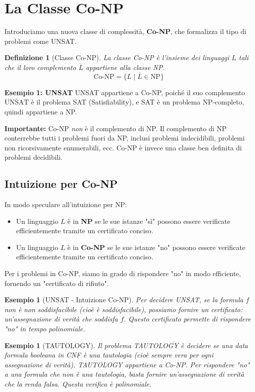 \documentclass[a4paper, 11pt]{book} %
\newtheorem{definition}[theorem]{Definizione}
\newtheorem{example}[theorem]{Esempio}
\theoremstyle{definition}
\begin{document}
\section{La Classe Co-NP}

Introduciamo una nuova classe di complessità, \textbf{Co-NP}, che formalizza il tipo di problemi come UNSAT.

\begin{definition}[Classe Co-NP]
La classe Co-NP è l'insieme dei linguaggi $L$ tali che il loro complemento $\overline{L}$ appartiene alla classe NP.
\[
\text{Co-NP} = \{ L \mid \overline{L} \in \text{NP} \}
\]
\end{definition}

\textbf{Esempio 1: UNSAT}
UNSAT appartiene a Co-NP, poiché il suo complemento $\overline{\text{UNSAT}}$ è il problema SAT (Satisfiability), e SAT è un problema NP-completo, quindi appartiene a NP.

\textbf{Importante:} Co-NP \textit{non} è il complemento di NP. Il complemento di NP conterrebbe tutti i problemi fuori da NP, inclusi problemi indecidibili, problemi non ricorsivamente enumerabili, ecc. Co-NP è invece una classe ben definita di problemi decidibili.

\subsection{Intuizione per Co-NP}
In modo speculare all'intuizione per NP:
\begin{itemize}
    \item Un linguaggio $L$ è in \textbf{NP} se le sue istanze "sì" possono essere verificate efficientemente tramite un certificato conciso.
    \item Un linguaggio $L$ è in \textbf{Co-NP} se le sue istanze "no" possono essere verificate efficientemente tramite un certificato conciso.
\end{itemize}
Per i problemi in Co-NP, siamo in grado di rispondere "no" in modo efficiente, fornendo un "certificato di rifiuto".

\begin{example}[UNSAT - Intuizione Co-NP]
Per decidere UNSAT, se la formula $f$ \textit{non è} non soddisfacibile (cioè è soddisfacibile), possiamo fornire un certificato: un'assegnazione di verità che soddisfa $f$. Questo certificato permette di rispondere "no" in tempo polinomiale.
\end{example}

\begin{example}[TAUTOLOGY]
Il problema TAUTOLOGY è decidere se una data formula booleana in CNF è una tautologia (cioè sempre vera per ogni assegnazione di verità).
TAUTOLOGY appartiene a Co-NP. Per rispondere "no" a una formula che \textit{non è} una tautologia, basta fornire un'assegnazione di verità che la renda falsa. Questa verifica è polinomiale.
\end{example}
\end{document}

